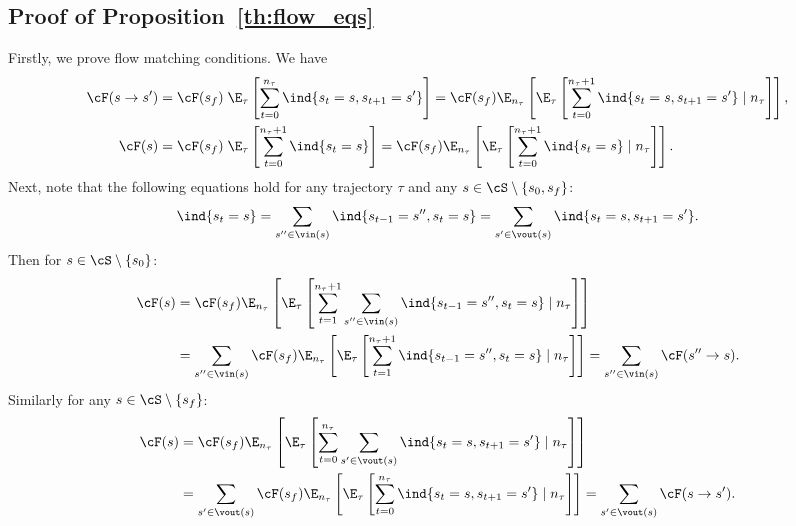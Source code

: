 \subsection{Proof of Proposition~\ref{th:flow_eqs}}\label{app:flow_eq_proof}
Firstly, we prove flow matching conditions. We have
\begin{equation*} %
\begin{split}
\cF(s \to s') & =\cF(s_f)\;\E_{\tau }\left[ \sum_{t = 0}^{n_{\tau}} \ind\{s_t = s, s_{t + 1} = s'\}\right] = \cF(s_f)\E_{n_\tau} \left[ \E_\tau\left[ \sum_{t = 0}^{n_{\tau}+1} \ind\{s_{t} = s, s_{t + 1} = s'\} \mid n_\tau\right] \right],  \\
\cF(s) & = \cF(s_f)\;\E_{\tau }\left[ \sum_{t = 0}^{n_{\tau}+1} \ind\{s_t = s\}\right] = \cF(s_f)\E_{n_\tau} \left[ \E_\tau\left[ \sum_{t = 0}^{n_{\tau}+1} \ind\{s_{t} = s\} \mid n_\tau\right] \right].
\end{split}
\end{equation*}
Next, note that the following equations hold for any trajectory $\tau$ and any $s \in \cS \setminus \{s_0, s_f\}$:
$$
    \ind\{s_t = s\} = \sum_{s'' \in \vin(s)} \ind \{s_{t - 1} = s'', s_{t} = s\} = \sum_{s' \in \vout(s)} \ind\{s_t = s, s_{t + 1} = s'\}.
$$
Then for $s \in \cS \setminus \{s_0\}$:
\begin{equation*} %
\begin{split}
\cF(s) & = \cF(s_f)\E_{n_\tau} \left[ \E_\tau\left[ \sum_{t = 1}^{n_{\tau}+1} \sum_{s'' \in \vin(s)} \ind\{s_{t - 1} = s'', s_{t} = s\} \mid n_\tau\right] \right]  \\
 & = \sum_{s'' \in \vin(s)} \cF(s_f)\E_{n_\tau} \left[ \E_\tau\left[ \sum_{t = 1}^{n_{\tau}+1} \ind\{s_{t - 1} = s'', s_{t} = s\} \mid n_\tau\right] \right] = \sum_{s'' \in \vin(s)} \cF(s'' \to s).
\end{split}
\end{equation*}
Similarly for any $s \in \cS \setminus \{s_f\}$:
\begin{equation*} %
\begin{split}
\cF(s) & = \cF(s_f)\E_{n_\tau} \left[ \E_\tau\left[ \sum_{t = 0}^{n_{\tau}} \sum_{s' \in \vout(s)} \ind\{s_{t} = s, s_{t+1} = s'\} \mid n_\tau\right] \right]  \\
 & = \sum_{s' \in \vout(s)} \cF(s_f)\E_{n_\tau} \left[ \E_\tau\left[ \sum_{t = 0}^{n_{\tau}} \ind\{s_{t} = s, s_{t+1} = s'\} \mid n_\tau\right] \right] = \sum_{s' \in \vout(s)} \cF(s \to s'). \\
\end{split}
\end{equation*}


